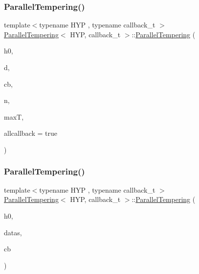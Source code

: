 \mbox{\label{class_parallel_tempering_a28bc2e02ad875e2b1cfcde9e428bf97e}} 
\subsubsection{\texorpdfstring{Parallel\+Tempering()}{ParallelTempering()}\hspace{0.1cm}{\footnotesize\ttfamily [2/3]}}
{\footnotesize\ttfamily template$<$typename H\+YP , typename callback\+\_\+t $>$ \\
\hyperlink{class_parallel_tempering}{Parallel\+Tempering}$<$ H\+YP, callback\+\_\+t $>$\+::\hyperlink{class_parallel_tempering}{Parallel\+Tempering} (\begin{DoxyParamCaption}\item[{H\+YP \&}]{h0,  }\item[{typename H\+Y\+P\+::data\+\_\+t $\ast$}]{d,  }\item[{callback\+\_\+t \&}]{cb,  }\item[{unsigned long}]{n,  }\item[{double}]{maxT,  }\item[{bool}]{allcallback = {\ttfamily true} }\end{DoxyParamCaption})\hspace{0.3cm}{\ttfamily [inline]}}

\mbox{\label{class_parallel_tempering_a3a186a1ae0f8ed02914d76a7a1dcd229}} 
\subsubsection{\texorpdfstring{Parallel\+Tempering()}{ParallelTempering()}\hspace{0.1cm}{\footnotesize\ttfamily [3/3]}}
{\footnotesize\ttfamily template$<$typename H\+YP , typename callback\+\_\+t $>$ \\
\hyperlink{class_parallel_tempering}{Parallel\+Tempering}$<$ H\+YP, callback\+\_\+t $>$\+::\hyperlink{class_parallel_tempering}{Parallel\+Tempering} (\begin{DoxyParamCaption}\item[{H\+YP \&}]{h0,  }\item[{std\+::vector$<$ typename H\+Y\+P\+::data\+\_\+t $>$ \&}]{datas,  }\item[{std\+::vector$<$ callback\+\_\+t $>$ \&}]{cb }\end{DoxyParamCaption})\hspace{0.3cm}{\ttfamily [inline]}}

